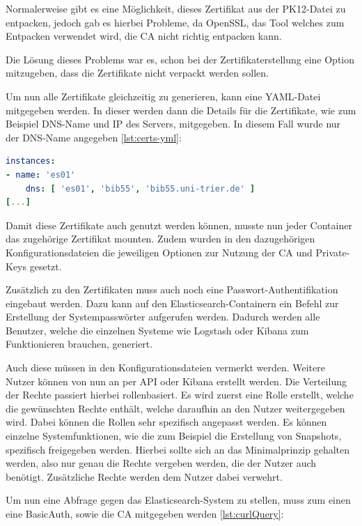 Normalerweise gibt es eine Möglichkeit, dieses Zertifikat aus der PK12-Datei zu entpacken, jedoch gab es hierbei Probleme, da OpenSSL, das Tool welches zum Entpacken verwendet wird, die CA nicht richtig entpacken kann. \cite{nerophon.2018}

Die Lösung dieses Problems war es, schon bei der Zertifikaterstellung eine Option mitzugeben, dass die Zertifikate nicht verpackt werden sollen. 

Um nun alle Zertifikate gleichzeitig zu generieren, kann eine YAML-Datei mitgegeben werden. In dieser werden dann die Details für die Zertifikate, wie zum Beispiel DNS-Name und IP des Servers, mitgegeben. In diesem Fall wurde nur der DNS-Name angegeben \ref{lst:certs-yml}:

\begin{lstlisting}[language=YAML, frame=single, label={lst:certs-yml}, caption=Auschnitt aus der Konfigurationsdatei für die Zertifikatgenerierung,captionpos=b] 
instances:
- name: 'es01'
	dns: [ 'es01', 'bib55', 'bib55.uni-trier.de' ]
[...]
\end{lstlisting}

Damit diese Zertifikate auch genutzt werden können, musste nun jeder Container das zugehörige Zertifikat mounten. Zudem wurden in den dazugehörigen Konfigurationsdateien die jeweiligen Optionen zur Nutzung der CA und Private-Keys gesetzt.

Zusätzlich zu den Zertifikaten muss auch noch eine Passwort-Authentifikation eingebaut werden. Dazu kann auf den Elasticsearch-Containern ein Befehl zur Erstellung der Systempasswörter aufgerufen werden. Dadurch werden alle Benutzer, welche die einzelnen Systeme wie Logstash oder Kibana zum Funktionieren brauchen, generiert.

Auch diese müssen in den Konfigurationsdateien vermerkt werden. Weitere Nutzer können von nun an per API oder Kibana erstellt werden. Die Verteilung der Rechte passiert hierbei rollenbasiert. Es wird zuerst eine Rolle erstellt, welche die gewünschten Rechte enthält, welche daraufhin an den Nutzer weitergegeben wird. Dabei können die Rollen sehr spezifisch angepasst werden. Es können einzelne Systemfunktionen, wie die zum Beispiel die Erstellung von Snapshots, spezifisch freigegeben werden. Hierbei sollte sich an das Minimalprinzip gehalten werden, also nur genau die Rechte vergeben werden, die der Nutzer auch benötigt. Zusätzliche Rechte werden dem Nutzer dabei verwehrt.

Um nun eine Abfrage gegen das Elasticsearch-System zu stellen, muss zum einen eine BasicAuth, sowie die CA mitgegeben werden \ref{lst:curlQuery}:


